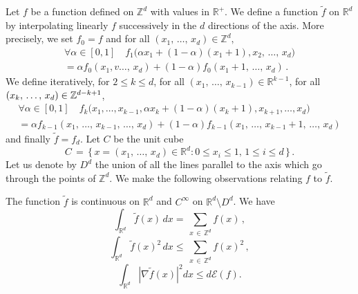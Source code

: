 \documentclass[AHL, Unicode, longabstracts, published]{cedram}
\newcommand*\Z {{\mathbb Z}}
\newcommand*\Zd {{\mathbb Z^d}}
\newcommand*\Rd {{\mathbb R^d}}
\newcommand*\R{\mathbb{R}}
\newcommand*\ft{\widetilde f}
\newcommand{\cE}{\mathcal{E}}
\let\oldforall\forall
\renewcommand*{\forall}{\mathrel{\oldforall}}
\begin{document}
Let $f$ be a function defined on $\Z^d$ with values in $\R^+$. We define a function $\ft$ on $\R^d$ by interpolating linearly $f$ successively in the $d$ directions of the axis. More precisely, we set $f_0=f$ and for all $(x_1,\,\dots,\,x_d)\in\Zd, $
\begin{multline*}
\forall \alpha\in [0,1]\quad f_1\big(\alpha x_1+(1-\alpha)(x_1+1),x_2,\,\dots,\,x_d\big)\\
=\alpha f_0(x_1,v\dots,\,x_d)+ (1-\alpha) f_0(x_1+1,\,\dots,\,x_d)\,.
\end{multline*}
We define iteratively, for $2\leq k\leq d$, for all $(x_1,\,\dots,\,x_{k-1})\in\R^{k-1}$, for all $(x_k,\,\dots,\,x_d)\linebreak\in\Z^{d-k+1}$,
\begin{multline*}
\forall \alpha\in [0,1]\quad f_k\big(x_1,\dots,x_{k-1},\alpha x_k+(1-\alpha)(x_k+1),x_{k+1},
\dots,x_d\big)\\
=\alpha f_{k-1}(x_1,\,\dots,\,x_{k-1},\,\dots,\,x_d)+ (1-\alpha) f_{k-1}(x_1,\,\dots,\,x_{k-1}+1,\,\dots,\,x_d)
\end{multline*}
and finally $\ft=f_d$. Let $C$ be the unit cube
\[
C\,=\,\big\{\,
x=(x_1,\,\dots,\,x_d)\in\Rd:0\leq x_i\leq 1,\,1\leq i\leq d\,\big\}\,.
\]
Let us denote by $D^d$ the union of all the lines parallel to the axis which go through the points of $\Zd$. We make the following observations relating $f$ to $\widetilde f$.
\begin{lemm}\label{L:ftildef}
The function $\ft$ is continuous on $\Rd$ and $C^\infty$ on $\Rd\setminus D^d$. We have
\begin{equation}\label{ftildef1}
\int_{\R^d} \widetilde f(x)\, dx = \,\sum_{x\,\in\,\Zd} f(x)\,,
\end{equation}
\begin{equation}\label{ftildef3}
\int_{\R^d} \widetilde f(x)^2\, dx \leq \,\sum_{x\,\in\,\Zd} f(x)^2\,,
\end{equation}
\begin{equation}\label{ftildef2}
\int_{\R^d} \left|\nabla \widetilde f(x)\right|^2 dx \le d \cE(f).
\end{equation}
\end{lemm}
\end{document}
